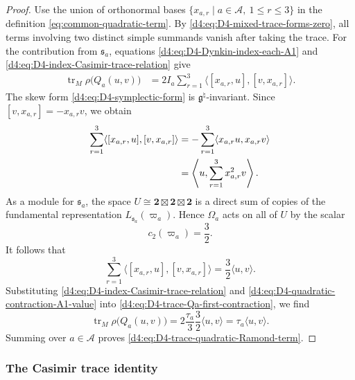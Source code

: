 \documentclass[11pt,reqno]{amsart}
\theoremstyle{definition}
\theoremstyle{remark}
\begin{document}
\begin{proof}
Use the union of orthonormal bases
\(\{x_{a,r}\mid a\in\mathcal A,\ 1\le r\le3\}\) in the definition
\eqref{eq:common-quadratic-term}.  By
\eqref{d4:eq:D4-mixed-trace-forms-zero}, all terms involving two distinct
simple summands vanish after taking the trace.  For the contribution
from \(\mathfrak s_a\), equations
\eqref{d4:eq:D4-Dynkin-index-each-A1} and
\eqref{d4:eq:D4-index-Casimir-trace-relation} give
\begin{align}
  \operatorname{tr}_M\rho\bigl(Q_a(u,v)\bigr)
  &=2I_a\sum_{r=1}^3
    \langle[x_{a,r},u],[v,x_{a,r}]\rangle.
  \label{d4:eq:D4-trace-Qa-first-contraction}
\end{align}
The skew form \eqref{d4:eq:D4-symplectic-form} is
\(\mathfrak g^\natural\)-invariant.  Since
\([v,x_{a,r}]=-x_{a,r}v\), we obtain
\begin{align*}
  \sum_{r=1}^3
  \langle[x_{a,r},u],[v,x_{a,r}]\rangle
  &=-\sum_{r=1}^3
    \langle x_{a,r}u,x_{a,r}v\rangle
    \notag\\
  &=\left\langle
      u,\sum_{r=1}^3x_{a,r}^2v
    \right\rangle.
\end{align*}
As a module for \(\mathfrak s_a\), the space
\(U\cong\mathbf2\boxtimes\mathbf2\boxtimes\mathbf2\) is a direct sum
of copies of the fundamental representation
\(L_{\mathfrak s_a}(\varpi_a)\).  Hence \(\Omega_a\) acts on all of
\(U\) by the scalar
\begin{equation*}
  c_2(\varpi_a)=\frac32.
\end{equation*}
It follows that
\begin{equation}
  \sum_{r=1}^3
  \langle[x_{a,r},u],[v,x_{a,r}]\rangle
  =\frac32\langle u,v\rangle.
  \label{d4:eq:D4-quadratic-contraction-A1-value}
\end{equation}
Substituting
\eqref{d4:eq:D4-index-Casimir-trace-relation} and
\eqref{d4:eq:D4-quadratic-contraction-A1-value} into
\eqref{d4:eq:D4-trace-Qa-first-contraction}, we find
\begin{equation*}
  \operatorname{tr}_M\rho\bigl(Q_a(u,v)\bigr)
  =2\frac{\tau_a}{3}\frac32\langle u,v\rangle
  =\tau_a\langle u,v\rangle.
\end{equation*}
Summing over \(a\in\mathcal A\) proves
\eqref{d4:eq:D4-trace-quadratic-Ramond-term}.
\end{proof}

\subsubsection{The Casimir trace identity}
\end{document}
